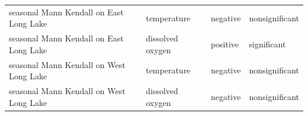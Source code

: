 \documentclass[12pt,]{article}
\begin{document}
\begin{longtable}[]{@{}llll@{}}
\begin{minipage}[t]{0.14\columnwidth}
seasonal Mann Kendall on East Long Lake\strut
\end{minipage} & \begin{minipage}[t]{0.22\columnwidth}\raggedright\strut
temperature\strut
\end{minipage} & \begin{minipage}[t]{0.14\columnwidth}\raggedright\strut
negative\strut
\end{minipage} & \begin{minipage}[t]{0.23\columnwidth}\raggedright\strut
nonsignificant\strut
\end{minipage}\tabularnewline
\begin{minipage}[t]{0.14\columnwidth}\raggedright\strut
seasonal Mann Kendall on East Long Lake\strut
\end{minipage} & \begin{minipage}[t]{0.22\columnwidth}\raggedright\strut
dissolved oxygen\strut
\end{minipage} & \begin{minipage}[t]{0.14\columnwidth}\raggedright\strut
positive\strut
\end{minipage} & \begin{minipage}[t]{0.23\columnwidth}\raggedright\strut
significant\strut
\end{minipage}\tabularnewline
\begin{minipage}[t]{0.14\columnwidth}\raggedright\strut
seasonal Mann Kendall on West Long Lake\strut
\end{minipage} & \begin{minipage}[t]{0.22\columnwidth}\raggedright\strut
temperature\strut
\end{minipage} & \begin{minipage}[t]{0.14\columnwidth}\raggedright\strut
negative\strut
\end{minipage} & \begin{minipage}[t]{0.23\columnwidth}\raggedright\strut
nonsignificant\strut
\end{minipage}\tabularnewline
\begin{minipage}[t]{0.14\columnwidth}\raggedright\strut
seasonal Mann Kendall on West Long Lake\strut
\end{minipage} & \begin{minipage}[t]{0.22\columnwidth}\raggedright\strut
dissolved oxygen\strut
\end{minipage} & \begin{minipage}[t]{0.14\columnwidth}\raggedright\strut
negative\strut
\end{minipage} & \begin{minipage}[t]{0.23\columnwidth}\raggedright\strut
nonsignificant\strut
\end{minipage}\tabularnewline
\bottomrule
\end{longtable}
\end{document}
